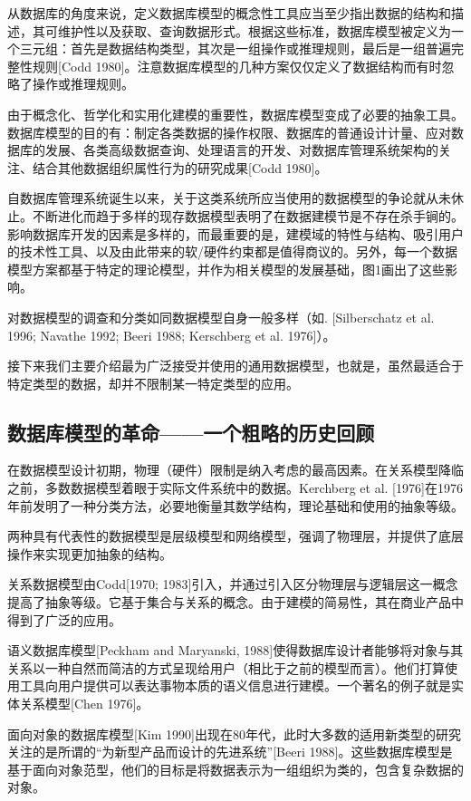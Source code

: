 \documentclass[a4paper]{ecust_thesis_translation}
\begin{document}
	从数据库的角度来说，定义数据库模型的概念性工具应当至少指出数据的结构和描述，其可维护性以及获取、查询数据形式。根据这些标准，数据库模型被定义为一个三元组：首先是数据结构类型，其次是一组操作或推理规则，最后是一组普遍完整性规则[Codd 1980]。注意数据库模型的几种方案仅仅定义了数据结构而有时忽略了操作或推理规则。

	由于概念化、哲学化和实用化建模的重要性，数据库模型变成了必要的抽象工具。数据库模型的目的有：制定各类数据的操作权限、数据库的普通设计计量、应对数据库的发展、各类高级数据查询、处理语言的开发、对数据库管理系统架构的关注、结合其他数据组织属性行为的研究成果[Codd 1980]。

	自数据库管理系统诞生以来，关于这类系统所应当使用的数据模型的争论就从未休止。不断进化而趋于多样的现存数据模型表明了在数据建模节是不存在杀手锏的。影响数据库开发的因素是多样的，而最重要的是，建模域的特性与结构、吸引用户的技术性工具、以及由此带来的软/硬件约束都是值得商议的。另外，每一个数据模型方案都基于特定的理论模型，并作为相关模型的发展基础，图1画出了这些影响。

	对数据模型的调查和分类如同数据模型自身一般多样（如. [Silberschatz et al. 1996; Navathe 1992; Beeri 1988; Kerschberg et al. 1976]）。

	接下来我们主要介绍最为广泛接受并使用的通用数据模型，也就是，虽然最适合于特定类型的数据，却并不限制某一特定类型的应用。

	\subsection{数据库模型的革命——一个粗略的历史回顾}
		在数据模型设计初期，物理（硬件）限制是纳入考虑的最高因素。在关系模型降临之前，多数数据模型着眼于实际文件系统中的数据。Kerchberg et al. [1976]在1976年前发明了一种分类方法，必要地衡量其数学结构，理论基础和使用的抽象等级。

		两种具有代表性的数据模型是层级模型和网络模型，强调了物理层，并提供了底层操作来实现更加抽象的结构。

		关系数据模型由Codd[1970; 1983]引入，并通过引入区分物理层与逻辑层这一概念提高了抽象等级。它基于集合与关系的概念。由于建模的简易性，其在商业产品中得到了广泛的应用。

		语义数据库模型[Peckham and Maryanski, 1988]使得数据库设计者能够将对象与其关系以一种自然而简洁的方式呈现给用户（相比于之前的模型而言）。他们打算使用工具向用户提供可以表达事物本质的语义信息进行建模。一个著名的例子就是实体关系模型[Chen 1976]。

		面向对象的数据库模型[Kim 1990]出现在80年代，此时大多数的适用新类型的研究关注的是所谓的“为新型产品而设计的先进系统”[Beeri 1988]。这些数据库模型是基于面向对象范型，他们的目标是将数据表示为一组组织为类的，包含复杂数据的对象。
\end{document}
